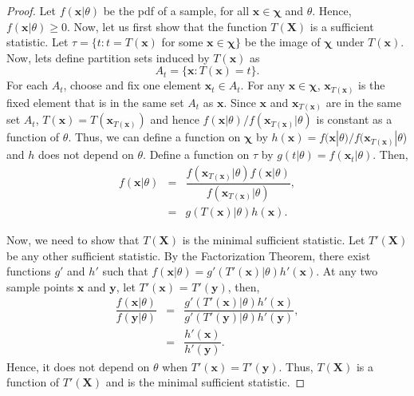 \documentclass[a4paper,english,12pt]{article}
\newcommand{\bx}{\mathbf{x}}
\newcommand{\by}{\mathbf{y}}
\newcommand{\bX}{\mathbf{X}}
\begin{document}
\begin{proof}
Let $f(\bx|\theta)$ be the pdf of a sample, for all $\bx\in\boldsymbol\chi$ and $\theta$. Hence, $f(\bx|\theta)\geq 0$.
Now, let us first show that the function $T(\bX)$ is a sufficient statistic. Let $\tau = \{t:t=T(\bx)$ for some $\bx\in\boldsymbol\chi\}$ be the image of $\boldsymbol\chi$ under $T(\bx)$. Now, lets define partition sets induced by $T(\bx)$ as
\begin{equation}
A_t=\{\bx:T(\bx) = t\}.
\end{equation}
For each $A_t$, choose and fix one element $\bx_t \in A_t$. For any $\bx\in\boldsymbol\chi$, $\bx_{T(\bx)}$ is the fixed element that is in the same set $A_t$ as $\bx$. Since $\bx$ and $\bx_{T(\bx)}$ are in the same set $A_t$, $T(\bx) = T(\bx_{T(\bx)})$ and hence $f(\bx|\theta)/f(\bx_{T(\bx)}|\theta)$ is constant as a function of $\theta$. Thus, we can define a function on $\boldsymbol\chi$ by $h(\bx) = f(\bx|\theta)/f(\bx_{T(\bx)}|\theta$) and $h$ does not depend on $\theta$. Define a function on $\tau$ by $g(t|\theta)=f(\bx_t|\theta)$. Then,
\begin{eqnarray}
f(\bx|\theta)&=&\dfrac{f(\bx_{T(\bx)}|\theta)f(\bx|\theta)}{f(\bx_{T(\bx)}|\theta)},\\
&=&g(T(\bx)|\theta)h(\bx).
\end{eqnarray}

Now, we need to show that $T(\bX)$ is the minimal sufficient statistic. Let $T'(\bX)$ be any other sufficient statistic. By the Factorization Theorem, there exist functions $g'$ and $h'$ such that $f(\bx|\theta) = g'(T'(\bx)|\theta)h'(\bx).$ At any two sample points $\bx$ and $\by$, let $T'(\bx)$ = $T'(\by)$, then,
\begin{eqnarray}
\dfrac{f(\bx|\theta)}{f(\by|\theta)} &=& \dfrac{g'(T'(\bx)|\theta)h'(\bx)}{g'(T'(\by)|\theta)h'(\by)},\\
&=& \dfrac{h'(\bx)}{h'(\by)}.
\end{eqnarray}
Hence, it does not depend on $\theta$ when $T'(\bx)=T'(\by)$. Thus, $T(\bX)$ is a function of $T'(\bX)$ and is the minimal sufficient statistic.
\end{proof}
\end{document}
